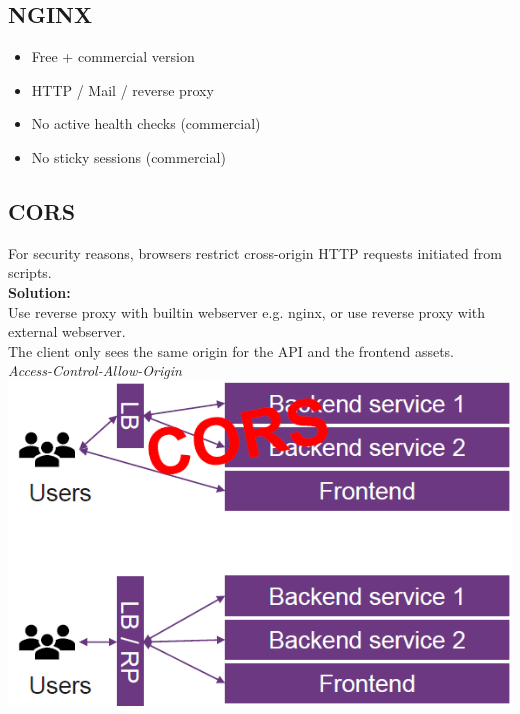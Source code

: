 \subsection{NGINX}
\begin{itemize}
    \item Free + commercial version
    \item HTTP / Mail / reverse proxy
    \item No active health checks (commercial)
    \item No sticky sessions (commercial)
\end{itemize}

\subsection{CORS}
For security reasons, browsers restrict cross-origin HTTP requests initiated from scripts.\\
\textbf{Solution:}\\
Use reverse proxy with builtin webserver e.g. nginx, or use reverse proxy with external webserver.\\
The client only sees the same origin for the API and the frontend assets.\\
\textit{Access-Control-Allow-Origin}
\includegraphics[width=0.6\linewidth]{img/reverse_proxy.png}